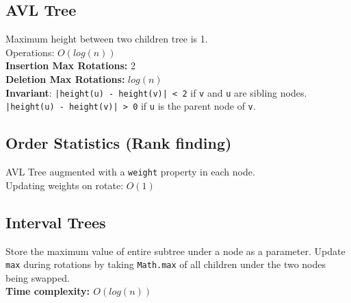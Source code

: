 \documentclass[10pt,landscape,a4paper]{article}
\begin{document}
\begin{multicols*}{4}
\subsection{AVL Tree}
Maximum height between two children tree is 1. \\
Operations: $O(log(n))$ \\
\textbf{Insertion Max Rotations:} 2 \\
\textbf{Deletion Max Rotations:} $log(n)$ \\
\textbf{Invariant}: \texttt{|height(u) - height(v)| < 2} if \texttt{v} and \texttt{u} are sibling nodes. \texttt{|height(u) - height(v)| > 0} if \texttt{u} is the parent node of \texttt{v}.
\subsection{Order Statistics (Rank finding)}
AVL Tree augmented with a \texttt{weight} property in each node. \\
Updating weights on rotate: $O(1)$ 


\subsection{Interval Trees}
Store the maximum value of entire subtree under a node as a parameter. Update \texttt{max} during rotations by taking \texttt{Math.max} of all children under the two nodes being swapped. \\
\textbf{Time complexity: $O(log(n))$} \\


\end{multicols*}
\end{document}
